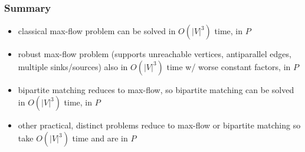 \documentclass{beamer}
\begin{document}
\begin{frame} \frametitle{Summary}
  \begin{itemize}
    \item classical max-flow problem can be solved in $O(|V|^3)$ time, in $P$
    \item robust max-flow problem (supports unreachable vertices, antiparallel edges, multiple sinks/sources)
      also in $O(|V|^3)$ time w/ worse constant factors, in $P$
    \item bipartite matching reduces to max-flow, so bipartite matching can be solved in
      $O(|V|^3)$ time, in $P$
    \item other practical, distinct problems reduce to max-flow or bipartite
      matching so take $O(|V|^3)$ time and are in $P$
  \end{itemize}
\end{frame}
\end{document}
